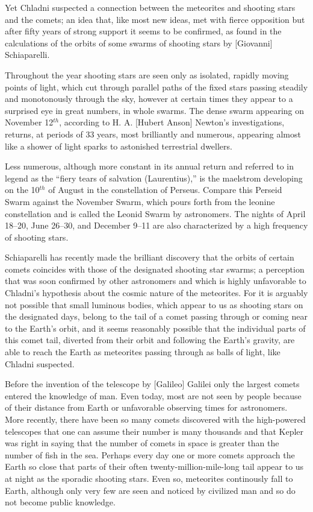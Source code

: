 \documentclass[a4paper, 12pt, oneside]{article}
\begin{document}
Yet Chladni suspected a connection between the meteorites and shooting stars and the comets; an idea that, like most new ideas, met with fierce opposition but after fifty years of strong support it seems to be confirmed, as found in the calculations of the orbits of some swarms of shooting stars by [Giovanni] Schiaparelli.

Throughout the year shooting stars are seen only as isolated, rapidly moving points of light, which cut through parallel paths of the fixed stars passing steadily and monotonously through the sky, however at certain times they appear to a surprised eye in great numbers, in whole swarms. The dense swarm appearing on November 12$^{th}$, according to H. A. [Hubert Anson] Newton's investigations, returns, at periods of 33 years, most brilliantly and numerous, appearing almost like a shower of light sparks to astonished terrestrial dwellers.

Less numerous, although more constant in its annual return and referred to in legend as the ``fiery tears of salvation (Laurentius),'' is the maelstrom developing on the 10$^{th}$ of August in the constellation of Perseus. Compare this Perseid Swarm against the November Swarm, which pours forth from the leonine constellation and is called the Leonid Swarm by astronomers. The nights of April 18--20, June 26--30, and December 9--11 are also characterized by a high frequency of shooting stars.

Schiaparelli has recently made the brilliant discovery that the orbits of certain comets coincides with those of the designated shooting star swarms; a perception that was soon confirmed by other astronomers and which is highly unfavorable to Chladni's hypothesis about the cosmic nature of the meteorites. For it is arguably not possible that small luminous bodies, which appear to us as shooting stars on the designated days, belong to the tail of a comet passing through or coming near to the Earth's orbit, and it seems reasonably possible that the individual parts of this comet tail, diverted from their orbit and following the Earth's gravity, are able to reach the Earth as meteorites passing through as balls of light, like Chladni suspected.

Before the invention of the telescope by [Galileo] Galilei only the largest comets entered the knowledge of man. Even today, most are not seen by people because of their distance from Earth or unfavorable observing times for astronomers. More recently, there have been so many comets discovered with the high-powered telescopes that one can assume their number is many thousands and that Kepler was right in saying that the number of comets in space is greater than the number of fish in the sea. Perhaps every day one or more comets approach the Earth so close that parts of their often twenty-million-mile-long tail appear to us at night as the sporadic shooting stars. Even so, meteorites continously fall to Earth, although only very few are seen and noticed by civilized man and so do not become public knowledge.
\end{document}
